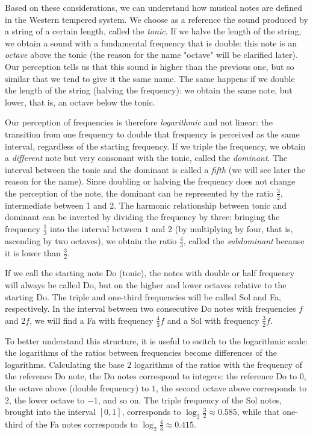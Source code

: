 Based on these considerations, we can understand how musical notes are defined
in the Western tempered system. We choose as a reference the sound produced by a
string of a certain length, called the \emph{tonic}. If we halve the length of
the string, we obtain a sound with a fundamental frequency that is double: this
note is an \emph{octave} above the tonic (the reason for the name "octave" will
be clarified later). Our perception tells us that this sound is higher than the
previous one, but so similar that we tend to give it the same name. The same
happens if we double the length of the string (halving the frequency): we obtain
the same note, but lower, that is, an octave below the tonic.

Our perception of frequencies is therefore \emph{logarithmic} and not linear:
the transition from one frequency to double that frequency is perceived as the
same interval, regardless of the starting frequency. If we triple the frequency,
we obtain a \emph{different} note but very consonant with the tonic, called the
\emph{dominant}. The interval between the tonic and the dominant is called a
\emph{fifth} (we will see later the reason for the name). Since doubling or
halving the frequency does not change the perception of the note, the dominant
can be represented by the ratio $\frac 3 2$, intermediate between 1 and 2. The
harmonic relationship between tonic and dominant can be inverted by dividing the
frequency by three: bringing the frequency $\frac 1 3$ into the interval between
$1$ and $2$ (by multiplying by four, that is, ascending by two octaves), we
obtain the ratio $\frac 4 3$, called the \emph{subdominant} because it is lower
than $\frac 3 2$.

If we call the starting note Do (tonic), the notes with double or half frequency
will always be called Do, but on the higher and lower octaves relative to the
starting Do. The triple and one-third frequencies will be called Sol and Fa,
respectively. In the interval between two consecutive Do notes with frequencies
$f$ and $2f$, we will find a Fa with frequency $\frac 4 3 f$ and a Sol with
frequency $\frac 3 2 f$.

To better understand this structure, it is useful to switch to the logarithmic
scale: the logarithms of the ratios between frequencies become differences of
the logarithms. Calculating the base $2$ logarithms of the ratios with the
frequency of the reference Do note, the Do notes correspond to integers: the
reference Do to $0$, the octave above (double frequency) to $1$, the second
octave above corresponds to $2$, the lower octave to $-1$, and so on. The triple
frequency of the Sol notes, brought into the interval $[0,1]$, corresponds to
$\log_2\frac 3 2 \approx 0.585$, while that one-third of the Fa notes
corresponds to $\log_2 \frac 4 3 \approx 0.415$.

